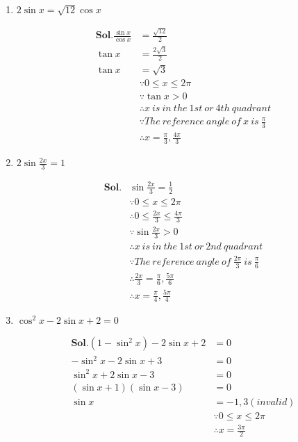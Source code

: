 \documentclass{report}
\begin{document}
\begin{multicols}{2}
\begin{enumerate}
\item $2\sin x = \sqrt{12}\cos x$

\begin{align*}
  \textbf{Sol.}\frac{\sin x}{\cos x} &= \frac{\sqrt{12}}{2} \\
  \tan x &= \frac{2\sqrt{3}}{2} \\
  \tan x &= \sqrt{3}\\
  &\because 0 \leq x \leq 2\pi \\
  &\because \tan x > 0 \\
  &\therefore x\ is\ in\ the\ 1st\ or\ 4th\ quadrant \\
  &\because The\ reference\ angle\ of \ x \ is \ \frac{\pi}{3} \\
  &\therefore x = \frac{\pi}{3}, \frac{4\pi}{3}
\end{align*}

\item $2\sin \frac{2x}{3} = 1$

\begin{align*}
  \textbf{Sol.}&\sin \frac{2x}{3} = \frac{1}{2} \\
  &\because 0 \leq x \leq 2\pi \\
  &\therefore 0 \leq \frac{2x}{3} \leq \frac{4\pi}{3} \\
  &\because \sin \frac{2x}{3} > 0 \\
  &\therefore x\ is\ in\ the\ 1st\ or\ 2nd\ quadrant \\
  &\because The\ reference\ angle\ of \ \frac{2\pi}{3} \ is \ \frac{\pi}{6} \\
  &\therefore \frac{2x}{3} = \frac{\pi}{6}, \frac{5\pi}{6}\\
  &\therefore x = \frac{\pi}{4}, \frac{5\pi}{4}
\end{align*}

\item $\cos^2 x - 2\sin x + 2 = 0$

\begin{align*}
  \textbf{Sol.}(1 - \sin^2 x) - 2\sin x + 2 &= 0 \\
  - \sin^2 x - 2\sin x + 3 &= 0 \\
  \sin^2 x + 2\sin x - 3 &= 0 \\
  (\sin x + 1)(\sin x - 3) &= 0 \\
  \sin x &= -1, 3(invalid) \\
  &\because 0 \leq x \leq 2\pi \\
  &\therefore x = \frac{3\pi}{2}
\end{align*}

\end{enumerate}
\end{multicols}
\end{document}
